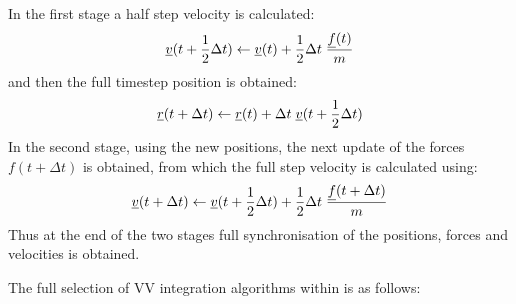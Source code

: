 In the first stage a half step velocity is calculated: 
\begin{equation}
\mbox{$\underline{v}$}(t + \frac{1}{2}\Delta t) \leftarrow  \mbox{$\underline{v}$}(t) + \frac{1}{2}\Delta t \; {\mbox{$\underline{f}$}(t)\over m}
\end{equation}
and then the full timestep position is obtained:
\begin{equation}
\mbox{$\underline{r}$}(t+\Delta t) \leftarrow \mbox{$\underline{r}$}(t) + \Delta t \;\mbox{$\underline{v}$}(t+{1\over 2}\Delta t)
\end{equation}
In the second stage, using the new positions, the next update of the
forces $f(t+\Delta t)$ is obtained, from which the full step
velocity is calculated using:
\begin{equation}
\mbox{$\underline{v}$}(t + \Delta t) \leftarrow  \mbox{$\underline{v}$}(t+{1\over 2} \Delta t) +
{1\over 2} \Delta t \; {\mbox{$\underline{f}$}(t + \Delta t)\over m}
\end{equation}
Thus at the end of the two stages full synchronisation of the
positions, forces and velocities is obtained.

The full selection of VV integration algorithms within \D{} is
as follows:

